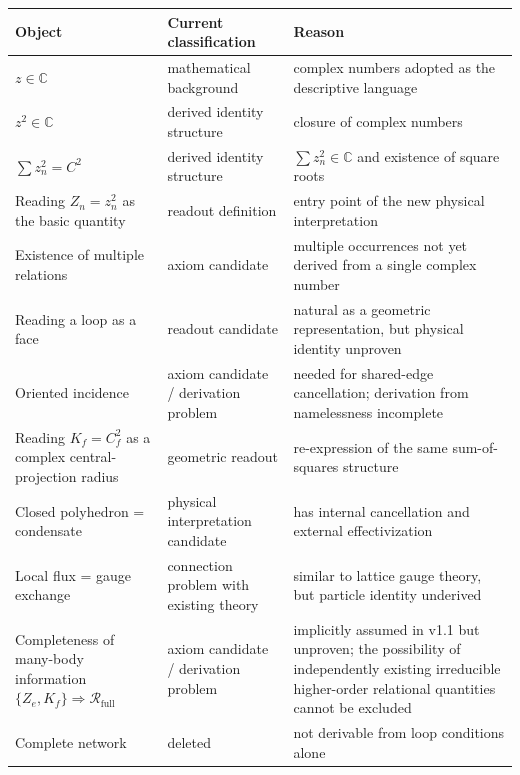 \documentclass[
  a4paper,
]{article}
\newcounter{none} %
\begin{document}
{\def\LTcaptype{none} %
\begin{longtable}[]{@{}
  >{\raggedright\arraybackslash}p{}
  >{\raggedright\arraybackslash}p{}
  >{\raggedright\arraybackslash}p{}@{}}
\toprule\noalign{}
\begin{minipage}[b]{\linewidth}\raggedright
Object
\end{minipage} & \begin{minipage}[b]{\linewidth}\raggedright
Current classification
\end{minipage} & \begin{minipage}[b]{\linewidth}\raggedright
Reason
\end{minipage} \\
\midrule\noalign{}
\endhead
\bottomrule\noalign{}
\endlastfoot
\(z\in\mathbb C\) & mathematical background & complex numbers adopted as
the descriptive language \\
\(z^2\in\mathbb C\) & derived identity structure & closure of complex
numbers \\
\(\sum z_n^2=C^2\) & derived identity structure &
\(\sum z_n^2\in\mathbb C\) and existence of square roots \\
Reading \(Z_n=z_n^2\) as the basic quantity & readout definition & entry
point of the new physical interpretation \\
Existence of multiple relations & axiom candidate & multiple occurrences
not yet derived from a single complex number \\
Reading a loop as a face & readout candidate & natural as a geometric
representation, but physical identity unproven \\
Oriented incidence & axiom candidate / derivation problem & needed for
shared-edge cancellation; derivation from namelessness incomplete \\
Reading \(K_f=C_f^2\) as a complex central-projection radius & geometric
readout & re-expression of the same sum-of-squares structure \\
Closed polyhedron = condensate & physical interpretation candidate & has
internal cancellation and external effectivization \\
Local flux = gauge exchange & connection problem with existing theory &
similar to lattice gauge theory, but particle identity underived \\
Completeness of many-body information
\(\{Z_e,K_f\}\Rightarrow\mathcal R_{\mathrm{full}}\) & axiom candidate /
derivation problem & implicitly assumed in v1.1 but unproven; the
possibility of independently existing irreducible higher-order
relational quantities cannot be excluded \\
Complete network & deleted & not derivable from loop conditions alone \\
\end{longtable}
}
\end{document}
